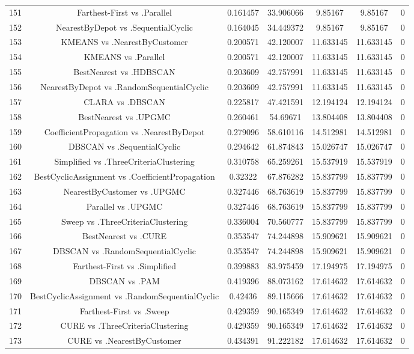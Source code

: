 \documentclass[a4paper,10pt]{article}
\begin{document}
\begin{landscape}
\begin{table}[!htp]
\begin{tabular}{ccccccc}
151&Farthest-First vs .Parallel&0.161457&33.906066&9.85167&9.85167&0\\
152&NearestByDepot vs .SequentialCyclic&0.164045&34.449372&9.85167&9.85167&0\\
153&KMEANS vs .NearestByCustomer&0.200571&42.120007&11.633145&11.633145&0\\
154&KMEANS vs .Parallel&0.200571&42.120007&11.633145&11.633145&0\\
155&BestNearest vs .HDBSCAN&0.203609&42.757991&11.633145&11.633145&0\\
156&NearestByDepot vs .RandomSequentialCyclic&0.203609&42.757991&11.633145&11.633145&0\\
157&CLARA vs .DBSCAN&0.225817&47.421591&12.194124&12.194124&0\\
158&BestNearest vs .UPGMC&0.260461&54.69671&13.804408&13.804408&0\\
159&CoefficientPropagation vs .NearestByDepot&0.279096&58.610116&14.512981&14.512981&0\\
160&DBSCAN vs .SequentialCyclic&0.294642&61.874843&15.026747&15.026747&0\\
161&Simplified vs .ThreeCriteriaClustering&0.310758&65.259261&15.537919&15.537919&0\\
162&BestCyclicAssignment vs .CoefficientPropagation&0.32322&67.876282&15.837799&15.837799&0\\
163&NearestByCustomer vs .UPGMC&0.327446&68.763619&15.837799&15.837799&0\\
164&Parallel vs .UPGMC&0.327446&68.763619&15.837799&15.837799&0\\
165&Sweep vs .ThreeCriteriaClustering&0.336004&70.560777&15.837799&15.837799&0\\
166&BestNearest vs .CURE&0.353547&74.244898&15.909621&15.909621&0\\
167&DBSCAN vs .RandomSequentialCyclic&0.353547&74.244898&15.909621&15.909621&0\\
168&Farthest-First vs .Simplified&0.399883&83.975459&17.194975&17.194975&0\\
169&DBSCAN vs .PAM&0.419396&88.073162&17.614632&17.614632&0\\
170&BestCyclicAssignment vs .RandomSequentialCyclic&0.42436&89.115666&17.614632&17.614632&0\\
171&Farthest-First vs .Sweep&0.429359&90.165349&17.614632&17.614632&0\\
172&CURE vs .ThreeCriteriaClustering&0.429359&90.165349&17.614632&17.614632&0\\
173&CURE vs .NearestByCustomer&0.434391&91.222182&17.614632&17.614632&0\\

\end{tabular}
\end{table}
\end{landscape}
\end{document}
